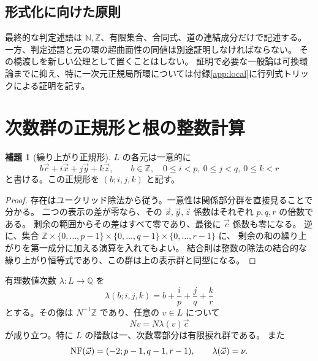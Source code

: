 \documentclass[11pt,a4paper]{ltjsarticle}
\numberwithin{equation}{section}
\theoremstyle{definition}
\newtheorem{lemma}[theorem]{補題}
\newcommand{\Z}{\mathbb Z}\newcommand{\N}{\mathbb N}\newcommand{\Q}{\mathbb Q}\newcommand{\C}{\mathbb C}
\newcommand{\xx}{\vec x}\newcommand{\yy}{\vec y}\newcommand{\zz}{\vec z}\newcommand{\cc}{\vec c}\newcommand{\ww}{\vec\omega}\newcommand{\ttau}{\vec\tau}
\begin{document}
\subsection{形式化に向けた原則}
最終的な判定述語は $\N,\Z$、有限集合、合同式、道の連結成分だけで記述する。
一方、判定述語と元の環の超曲面性の同値は別途証明しなければならない。
その橋渡しを新しい公理として置くことはしない。
証明で必要な一般論は可換環論までに抑え、特に一次元正規局所環については付録\ref{app:local}に行列式トリックによる証明を記す。

\section{次数群の正規形と根の整数計算}\label{sec:root}
\begin{lemma}[繰り上がり正規形]\label{lem:nf}
$L$ の各元は一意的に
\[
 b\cc+i\xx+j\yy+k\zz,\qquad b\in\Z,\quad
 0\le i<p,\ 0\le j<q,\ 0\le k<r
\]
と書ける。この正規形を $(b;i,j,k)$ と記す。
\end{lemma}
\begin{proof}
存在はユークリッド除法から従う。一意性は関係部分群を直接見ることで分かる。
二つの表示の差が零なら、その $\xx,\yy,\zz$ 係数はそれぞれ $p,q,r$ の倍数である。
剰余の範囲からその差はすべて零であり、最後に $\cc$ 係数も零になる。
逆に、集合 $\Z\times\{0,\dots,p-1\}\times\{0,\dots,q-1\}\times\{0,\dots,r-1\}$ に、
剰余の和の繰り上がりを第一成分に加える演算を入れてもよい。
結合則は整数の除法の結合的な繰り上がり恒等式であり、この群は上の表示群と同型になる。
\end{proof}
有理数値次数 $\lambda:L\to\Q$ を
\[
 \lambda(b;i,j,k)=b+\frac{i}{p}+\frac{j}{q}+\frac{k}{r}
\]
とする。その像は $N^{-1}\Z$ であり、任意の $v\in L$ について
\begin{equation}\label{eq:Nv}
 Nv=N\lambda(v)\cc
\end{equation}
が成り立つ。特に $L$ の階数は一、次数零部分は有限捩れ群である。
また
\[
 \NF(\ww)=(-2;p-1,q-1,r-1),\qquad \lambda(\ww)=\nu.
\]
\end{document}
